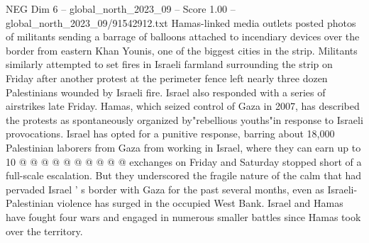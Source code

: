 \begin{textsample}{NEG Dim 6 – global\_north\_2023\_09 – Score 1.00 – global\_north\_2023\_09/91542912.txt}
Hamas-linked media outlets posted photos of militants sending a barrage of balloons attached to incendiary devices over the border from eastern Khan Younis, one of the biggest cities in the strip.
Militants similarly attempted to set fires in Israeli farmland surrounding the strip on Friday after another protest at the perimeter fence left nearly three dozen Palestinians wounded by Israeli fire.
Israel also responded with a series of airstrikes late Friday.
Hamas, which seized control of Gaza in 2007, has described the protests as spontaneously organized by"rebellious youths"in response to Israeli provocations.
Israel has opted for a punitive response, barring about 18,000 Palestinian laborers from Gaza from working in Israel, where they can earn up to 10 @ @ @ @ @ @ @ @ @ @ exchanges on Friday and Saturday stopped short of a full-scale escalation.
But they underscored the fragile nature of the calm that had pervaded Israel ' s border with Gaza for the past several months, even as Israeli-Palestinian violence has surged in the occupied West Bank.
Israel and Hamas have fought four wars and engaged in numerous smaller battles since Hamas took over the territory.

\end{textsample}
